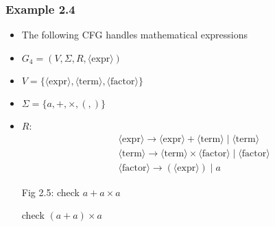 




\begin{frame}[allowframebreaks] \frametitle{Example 2.4}
  \begin{itemize}
  \item The following CFG handles mathematical expressions
\item $G_4=
(V, \Sigma, R, \langle \text{expr}\rangle)$

\item [] $V=\{\langle \text{expr}\rangle,\langle \text{term}\rangle,\langle \text{factor}\rangle\}
$

\item [] $\Sigma=\{a,+,\times,(,)\}$
\item [] $R$:
\begin{eqnarray*}
&& \langle \text{expr}\rangle \rightarrow \langle \text{expr}\rangle+\langle \text{term}\rangle\mid\langle \text{term}\rangle\\
&& \langle \text{term}\rangle  \rightarrow \langle \text{term}\rangle\times\langle \text{factor}\rangle\mid 
\langle \text{factor}\rangle\\
&& \langle \text{factor}\rangle\rightarrow (\langle \text{expr}\rangle)\mid a
\end{eqnarray*}

Fig 2.5: check
$a+a\times a$

\framebreak


check $(a+a) \times a$

\framebreak


\end{itemize}
\end{frame}
